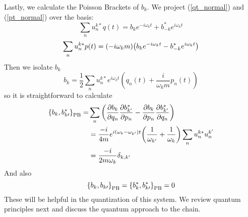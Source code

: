 Lastly, we calculate the Poisson Brackets of $b_k$.  We project (\ref{qt_normal}) and (\ref{pt_normal}) over the basis:
\begin{equation}
    \sum_n u_n^{k*}q(t)=b_ke^{-i\omega_kt}+b_{-k}^*e^{i\omega_kt}
\end{equation}
\begin{equation}
    \sum_n u_n^{k*}p(t)=(-i\omega_km)\qty(b_ke^{-i\omega_kt}-b_{-k}^*e^{i\omega_kt})
\end{equation}
Then we isolate  $b_k$
\begin{equation}
b_{k}=\frac{1}{2} \sum_{n} u_{n}^{k *}e^{i\omega_k t}\left(q_{n}(t)+\frac{{i}}{\omega_{k}m} {p}_{n}(t)\right)
\end{equation}
so it is straightforward to calculate
\begin{equation}
\begin{aligned}
        \pb{b_k}{b_{k\prime}^{*}}_{\text{PB}}=&\sum_n\left(\pdv{b_k}{q_n}\pdv{b_{k^\prime}^{*}}{p_n}-\pdv{b_k}{p_n}\pdv{b_{k^\prime}^{*}}{q_n}\right)\\
        &=\frac{-{i}}{4m}{e}^{{i}(\omega_k-\omega_{k^\prime})t}\qty(\frac{1}{\omega_{k^\prime}}+\frac{1}{\omega_k})\sum_nu_n^{k *}u_n^{k^\prime}\\
        &=\frac{-{i}}{2m\omega_k}\delta_{k,k^\prime}
\end{aligned}
\label{bkbkstar}
\end{equation}
And also
\begin{equation}
     \pb{b_k}{b_{k\prime}}_{\text{PB}}= \pb{b_k^*}{b_{k\prime}^{*}}_{\text{PB}}=0
     \label{bkbkbkstarbkstar}
\end{equation}
These will be helpful in the quantization of this system. We review quantum principles next and discuss the quantum approach to the chain.
